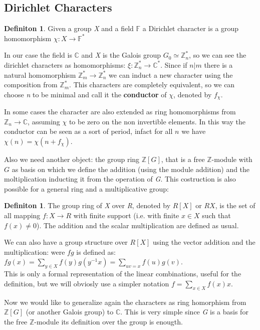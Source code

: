 \documentclass[]{article}
\theoremstyle{plain}
\theoremstyle{remark}
\theoremstyle{definition}
\newtheorem{deff}[teo]{Definiton}
\newcommand{\Z}{\mathbb{Z}}
\newcommand{\F}{\mathbb{F}}
\newcommand{\C}{\mathbb{C}}
\begin{document}
	\subsection{Dirichlet Characters}
	 
	 \begin{deff}
	 	Given a group \textit{X} and a field $ \F $ a Dirichlet character is a group homomorphism $ \chi :X \to \F ^*  $
	 \end{deff}
	 
	 In our case the field is $ \C $ and \textit{X} is the Galois group $ G_0 \simeq \Z_{n}^*$, so we can see the dirichlet characters as homomorphisms: $ \xi :  \Z_{n}^* \to \C ^* $. Since if $ n | m $ there is a natural homomorphism $ \Z_m^* \to \Z_n^* $ we can induct a new character using the composition from $ \Z_m ^* $. This characters are completely equivalent, so we can choose \textit{n} to be minimal and call it the \textbf{conductor} of $\chi$, denoted by $ f_\chi $. 
	 
	 In some cases the character are also extended as ring homomorphisms from $ \Z_n \to \C $, assuming $ \chi $ to be zero on the non invertible elements. In this way the conductor can be seen as a sort of period, infact for all $ n $ we have $ \chi(n)=\chi(n+f_\chi) $. 
	 
	 Also we need another object: the group ring $ \Z[G] $, that is a free $ \Z $-module with $ G $ as basis on which we define the addition (using the module addition)  and the moltiplication inducting it from the operation of \textit{G}.
	 This costruction is also possible for a general ring and a multiplicative group:
	 
	 \begin{deff}
	 	The group ring of \textit{X} over \textit{R}, denoted by $ R[X] $ or $ RX $, is the set of all mapping $ f : X \to R $ with finite support (i.e. with finite $ x \in X $ such that $ f(x) \neq 0 $). The addition and the scalar multiplication are defined as usual. 
	 \end{deff}
 
 	We can also have a group structure over $ R[X] $ using the vector addition and the multiplication: were $ fg $ is defined as: $ fg(x) = \sum_{ y \in X } f(y)g(y^{-1}x) = \sum_{uv = x} f(u)g(v)$.\\
 	This is only a formal representation of the linear combinations, useful for the definition, but we will obviosly use a simpler notation $ f = \sum_{x \in X} f(x) x $.
 	
 	Now we would like to generalize again the characters as ring homorphism from $ \Z[G] $ (or another Galois group) to $ \C $. This is very simple since \textit{G} is a basis for the free $ \Z $-module its definition over the group is enougth. 
	
\end{document}

